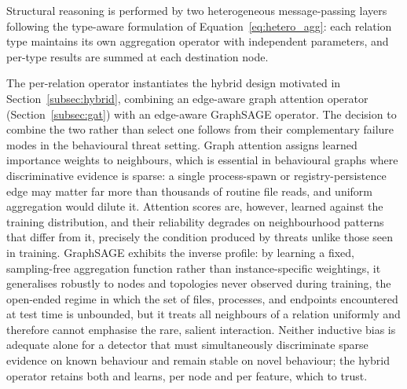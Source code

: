 \documentclass[%
    BCOR=10mm,
    DIV=13,
    toc=bibliography,
    toc=listof,
    oneside,
    12pt,
]{scrbook}
\begin{document}
Structural reasoning is performed by two heterogeneous message-passing layers
following the type-aware formulation of Equation~\ref{eq:hetero_agg}: each
relation type maintains its own aggregation operator with independent
parameters, and per-type results are summed at each destination node.

The per-relation operator instantiates the hybrid design motivated in
Section~\ref{subsec:hybrid}, combining an edge-aware graph attention operator
(Section~\ref{subsec:gat}) with an edge-aware GraphSAGE operator. The decision
to combine the two rather than select one follows from their complementary
failure modes in the behavioural
threat setting. Graph attention assigns learned importance weights to
neighbours, which is essential in behavioural graphs where discriminative
evidence is sparse: a single process-spawn or registry-persistence edge may
matter far more than thousands of routine file reads, and uniform aggregation
would dilute it. Attention scores are,
however, learned against the training distribution, and their reliability
degrades on neighbourhood patterns that differ from it, precisely the
condition produced by threats unlike those seen in training. GraphSAGE exhibits
the inverse profile: by learning a fixed, sampling-free aggregation function
rather than
instance-specific weightings, it generalises robustly to nodes and topologies
never observed during training, the open-ended regime in which the set of
files, processes, and endpoints encountered at test time is unbounded, but it
treats all neighbours of a relation uniformly and therefore cannot emphasise
the rare, salient interaction. Neither inductive bias is adequate alone for a
detector that must simultaneously discriminate sparse evidence on known
behaviour and remain stable on novel behaviour; the hybrid operator retains
both and learns, per node and per feature, which to trust.
\end{document}
